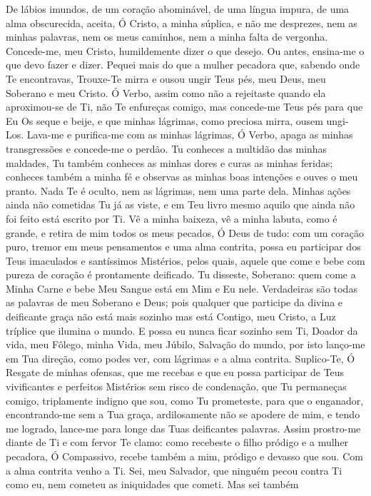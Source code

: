 \documentclass{subfiles}
\begin{document}
De lábios imundos, de um coração abominável, de uma língua impura, de uma alma
obscurecida, aceita, Ó Cristo, a minha súplica, e não me desprezes, nem as
minhas palavras, nem os meus caminhos, nem a minha falta de vergonha.
Concede-me, meu Cristo, humildemente dizer o que desejo. Ou antes, ensina-me o
que devo fazer e dizer. Pequei mais do que a mulher pecadora que, sabendo onde
Te encontravas, Trouxe-Te mirra e ousou ungir Teus pés, meu Deus, meu Soberano e
meu Cristo. Ó Verbo, assim como não a rejeitaste quando ela aproximou-se de Ti,
não Te enfureças comigo, mas concede-me Teus pés para que Eu Os seque e beije, e
que minhas lágrimas, como preciosa mirra, ousem ungi-Los. Lava-me e purifica-me
com as minhas lágrimas, Ó Verbo, apaga as minhas transgressões e concede-me o
perdão. Tu conheces a multidão das minhas maldades, Tu também conheces as minhas
dores e curas as minhas feridas; conheces também a minha fé e observas as minhas
boas intenções e ouves o meu pranto. Nada Te é oculto, nem as lágrimas, nem uma
parte dela. Minhas ações ainda não cometidas Tu já as viste, e em Teu livro
mesmo aquilo que ainda não foi feito está escrito por Ti. Vê a minha baixeza, vê
a minha labuta, como é grande, e retira de mim todos os meus pecados, Ó Deus de
tudo: com um coração puro, tremor em meus pensamentos e uma alma contrita, possa
eu participar dos Teus imaculados e santíssimos Mistérios, pelos quais, aquele
que come e bebe com pureza de coração é prontamente deificado. Tu disseste,
Soberano: quem come a Minha Carne e bebe Meu Sangue está em Mim e Eu nele.
Verdadeiras são todas as palavras de meu Soberano e Deus; pois qualquer que
participe da divina e deificante graça não está mais sozinho mas está Contigo,
meu Cristo, a Luz tríplice que ilumina o mundo. E possa eu nunca ficar sozinho
sem Ti, Doador da vida, meu Fôlego, minha Vida, meu Júbilo, Salvação do mundo,
por isto lanço-me em Tua direção, como podes ver, com lágrimas e a alma
contrita. Suplico-Te, Ó Resgate de minhas ofensas, que me recebas e que eu possa
participar de Teus vivificantes e perfeitos Mistérios sem risco de condenação,
que Tu permaneças comigo, triplamente indigno que sou, como Tu prometeste, para
que o enganador, encontrando-me sem a Tua graça, ardilosamente não se apodere de
mim, e tendo me logrado, lance-me para longe das Tuas deificantes palavras.
Assim prostro-me diante de Ti e com fervor Te clamo: como recebeste o filho
pródigo e a mulher pecadora, Ó Compassivo, recebe também a mim, pródigo e
devasso que sou. Com a alma contrita venho a Ti. Sei, meu Salvador, que ninguém
pecou contra Ti como eu, nem cometeu as iniquidades que cometi. Mas sei também
\end{document}
